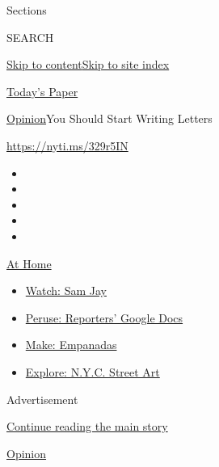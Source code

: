 Sections

SEARCH

\protect\hyperlink{site-content}{Skip to
content}\protect\hyperlink{site-index}{Skip to site index}

\href{https://myaccount.nytimes.com/auth/login?response_type=cookie\&client_id=vi}{}

\href{https://www.nytimes.com/section/todayspaper}{Today's Paper}

\href{/section/opinion}{Opinion}\textbar{}You Should Start Writing
Letters

\href{https://nyti.ms/329r5IN}{https://nyti.ms/329r5IN}

\begin{itemize}
\item
\item
\item
\item
\item
\end{itemize}

\href{https://www.nytimes.com/spotlight/at-home?action=click\&pgtype=Article\&state=default\&region=TOP_BANNER\&context=at_home_menu}{At
Home}

\begin{itemize}
\tightlist
\item
  \href{https://www.nytimes.com/2020/08/04/arts/television/sam-jay-netflix-special.html?action=click\&pgtype=Article\&state=default\&region=TOP_BANNER\&context=at_home_menu}{Watch:
  Sam Jay}
\item
  \href{https://www.nytimes.com/interactive/2020/at-home/even-more-reporters-editors-diaries-lists-recommendations.html?action=click\&pgtype=Article\&state=default\&region=TOP_BANNER\&context=at_home_menu}{Peruse:
  Reporters' Google Docs}
\item
  \href{https://www.nytimes.com/2020/08/04/dining/colombian-empanadas-carlos-gaviria.html?action=click\&pgtype=Article\&state=default\&region=TOP_BANNER\&context=at_home_menu}{Make:
  Empanadas}
\item
  \href{https://www.nytimes.com/2020/08/06/arts/design/street-art-nyc-george-floyd.html?action=click\&pgtype=Article\&state=default\&region=TOP_BANNER\&context=at_home_menu}{Explore:
  N.Y.C. Street Art}
\end{itemize}

Advertisement

\protect\hyperlink{after-top}{Continue reading the main story}

\href{/section/opinion}{Opinion}

